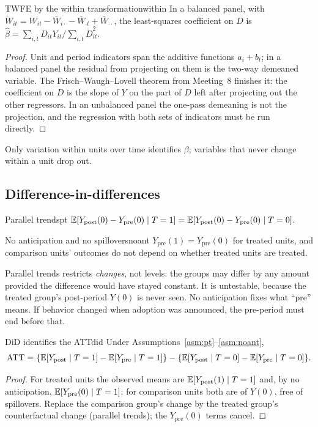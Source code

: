 \documentclass[11pt]{article}
\begin{document}
\begin{prop}{TWFE by the within transformation}{within}
In a balanced panel, with $\ddot W_{it} = W_{it} - \bar W_{i\cdot} - \bar W_{\cdot t} + \bar W_{\cdot\cdot}$, the least-squares coefficient on $D$ is
$\hat\beta = \sum_{i,t}\ddot D_{it}Y_{it}/\sum_{i,t}\ddot D_{it}^2$.
\end{prop}
\begin{proof}
Unit and period indicators span the additive functions $a_i + b_t$; in a balanced panel the residual from projecting on them is the
two-way demeaned variable. The Frisch--Waugh--Lovell theorem from Meeting~8 finishes it: the coefficient on $D$ is the slope of $Y$
on the part of $D$ left after projecting out the other regressors. In an unbalanced panel the one-pass demeaning is not the
projection, and the regression with both sets of indicators must be run directly.
\end{proof}

Only variation within units over time identifies $\beta$; variables that never change within a unit drop out.

\subsection{Difference-in-differences}

\begin{assum}{Parallel trends}{pt}
$\mathbb{E}[Y_{\text{post}}(0) - Y_{\text{pre}}(0) \mid T=1] = \mathbb{E}[Y_{\text{post}}(0) - Y_{\text{pre}}(0) \mid T=0]$.
\end{assum}
\begin{assum}{No anticipation and no spillovers}{noant}
$Y_{\text{pre}}(1) = Y_{\text{pre}}(0)$ for treated units, and comparison units' outcomes do not depend on whether treated units are treated.
\end{assum}

Parallel trends restricts \emph{changes}, not levels: the groups may differ by any amount provided the difference would have stayed constant.
It is untestable, because the treated group's post-period $Y(0)$ is never seen. No anticipation fixes what ``pre'' means. If behavior changed
when adoption was announced, the pre-period must end before that.

\begin{prop}{DiD identifies the ATT}{did}
Under Assumptions~\ref{asm:pt}--\ref{asm:noant},
\[
  \text{ATT} = \{\mathbb{E}[Y_{\text{post}} \mid T=1] - \mathbb{E}[Y_{\text{pre}} \mid T=1]\} - \{\mathbb{E}[Y_{\text{post}} \mid T=0] - \mathbb{E}[Y_{\text{pre}} \mid T=0]\}.
\]
\end{prop}
\begin{proof}
For treated units the observed means are $\mathbb{E}[Y_{\text{post}}(1) \mid T=1]$ and, by no anticipation, $\mathbb{E}[Y_{\text{pre}}(0) \mid T=1]$; for comparison units
both are of $Y(0)$, free of spillovers. Replace the comparison group's change by the treated group's counterfactual change (parallel trends);
the $Y_{\text{pre}}(0)$ terms cancel.
\end{proof}
\end{document}
